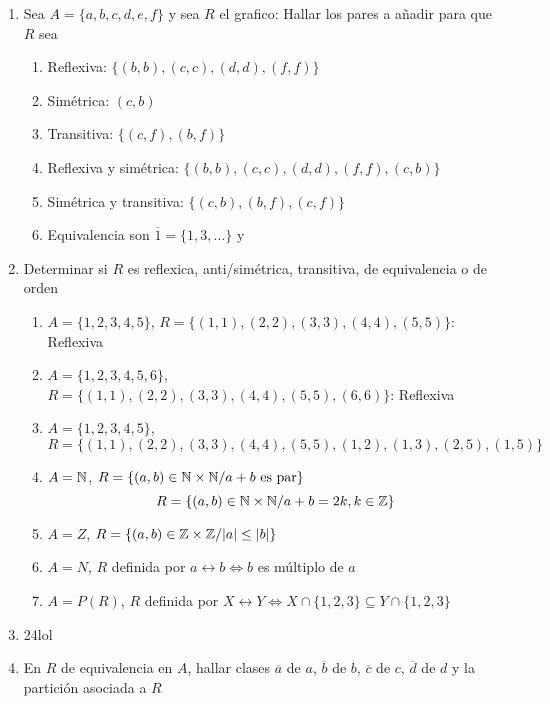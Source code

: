 \documentclass[../practica.root.tex]{subfiles}
\begin{document}
\begin{enumerate}
    \item Sea $A = \{a, b, c, d, e, f\}$ y sea $R$ el grafico:
          Hallar los pares a añadir para que $R$ sea
          \begin{enumerate}
              \item Reflexiva: $\{(b, b), (c, c), (d, d), (f, f)\}$
              \item Simétrica: $(c, b)$
              \item Transitiva: $\{(c, f), (b, f)\}$
              \item Reflexiva y simétrica: $\{(b, b), (c, c), (d, d), (f, f), (c, b)\}$
              \item Simétrica y transitiva: $\{(c, b), (b, f), (c, f)\}$
              \item Equivalencia son $\overline{1} = \{1, 3, \dots\}$ y  %
          \end{enumerate}
    \item Determinar si $R$ es reflexica, anti/simétrica, transitiva, de equivalencia o de orden
          \begin{enumerate}
              \item $A = \{1, 2, 3, 4, 5\}$, $R = \{(1, 1), (2, 2), (3, 3), (4, 4), (5, 5)\}$: Reflexiva
              \item $A = \{1, 2, 3, 4, 5, 6\}$, $R = \{(1, 1), (2, 2), (3, 3), (4, 4), (5, 5), (6, 6)\}$: Reflexiva
              \item $A = \{1, 2, 3, 4, 5\}$, $R = \{(1, 1),(2, 2),(3, 3),(4, 4),(5, 5),(1, 2),(1, 3),(2, 5),(1, 5)\}$
              \item $A = \mathbb{N}$, $R = \{(a, b) \in \mathbb{N} \times \mathbb{N} / a + b \text{ es par}\}$
                    \[ R = \{(a, b) \in \mathbb{N} \times \mathbb{N} / a + b = 2k, k \in \mathbb{Z} \} \]
              \item $A = Z$, $R = \{(a, b) \in \mathbb{Z} \times \mathbb{Z} / |a| \leq |b|\}$
              \item $A = N$, $R$ definida por $a \rel b \iff b$ es múltiplo de $a$
              \item $A = P(R)$, $R$ definida por $X \rel Y \iff X \cap \{1, 2, 3\} \subseteq Y \cap \{1, 2, 3\}$
          \end{enumerate}
    \item 24lol
    \item En $R$ de equivalencia en $A$, hallar clases $\overline{a}$ de $a$, $\overline{b}$ de $b$, $\overline{c}$ de $c$, $\overline{d}$ de $d$ y la partición asociada a $R$
          \begin{align*}

\end{align*}
\end{enumerate}
\end{document}
